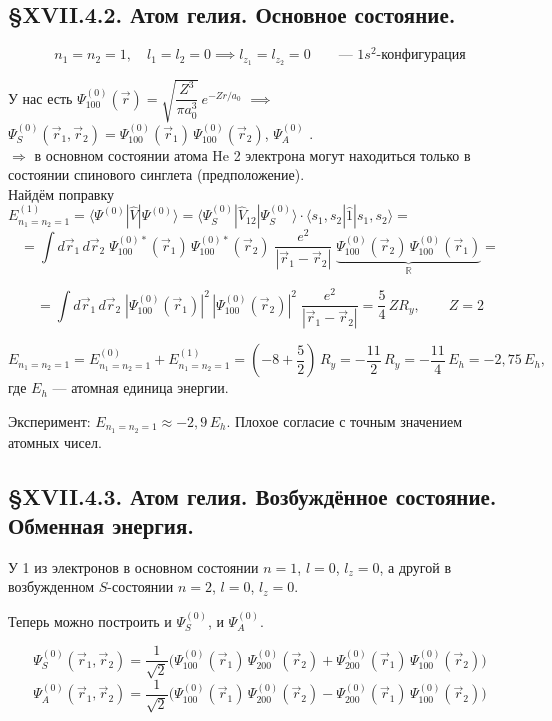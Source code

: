 \subsection{\S XVII.4.2. Атом гелия. Основное состояние.}

\[
n_1 = n_2 = 1, \quad l_1 = l_2 = 0 \implies l_{z_1} = l_{z_2} = 0 \qquad \text{--- $1s^2$-конфигурация}
\]

У нас есть $\Psi^{(0)}_{100}(\vec{r}) = \sqrt{\dfrac{Z^3}{\pi a_0^3}}\,e^{-Zr/a_0}$
$\implies$
$\Psi^{(0)}_S(\vec{r}_1, \vec{r}_2) = \Psi^{(0)}_{100}(\vec{r}_1)\,\Psi^{(0)}_{100}(\vec{r}_2)$, \quad $\Psi^{(0)}_A$ .\\

$\Rightarrow$ в основном состоянии атома He 2 электрона могут находиться только в состоянии спинового синглета (предположение).\\


Найдём поправку \quad $E^{(1)}_{n_1=n_2=1} = \langle\Psi^{(0)}|\hat{V}|\Psi^{(0)}\rangle = \langle\Psi^{(0)}_S|\hat{V}_{12}|\Psi^{(0)}_S\rangle\cdot\langle s_1, s_2|\hat{1}|s_1,s_2\rangle = $
\[
 = \int d\vec{r}_1\,d\vec{r}_2\;\Psi^{(0)*}_{100}(\vec{r}_1)\,\Psi^{(0)*}_{100}(\vec{r}_2)\;\dfrac{e^2}{|\vec{r}_1-\vec{r}_2|}\;\underbrace{\Psi^{(0)}_{100}(\vec{r}_2)\,\Psi^{(0)}_{100}(\vec{r}_1)}_{\mathbb{R}} =
\]

\[
= \int d\vec{r}_1\,d\vec{r}_2\;|\Psi^{(0)}_{100}(\vec{r}_1)|^2\,|\Psi^{(0)}_{100}(\vec{r}_2)|^2\;\frac{e^2}{|\vec{r}_1-\vec{r}_2|}
= \frac{5}{4}\,Z R_y, \qquad Z = 2
\]

\[
E_{n_1=n_2=1} = E^{(0)}_{n_1=n_2=1} + E^{(1)}_{n_1=n_2=1}
= (-8 + \frac{5}{2})\,R_y = -\frac{11}{2}\,R_y = -\frac{11}{4}\,E_h = -2{,}75\,E_h,
\]
где $E_h$ --- атомная единица энергии.

Эксперимент: $E_{n_1=n_2=1} \approx -2{,}9\,E_h$. Плохое согласие с точным значением атомных чисел.

\subsection{\S XVII.4.3. Атом гелия. Возбуждённое состояние. Обменная энергия.}

У 1 из электронов в основном состоянии \quad $n = 1$, $l = 0$, $l_z = 0$,
а другой в возбужденном $S$-состоянии \quad $n = 2$, $l = 0$, $l_z = 0$.

Теперь можно построить и $\Psi^{(0)}_S$, и $\Psi^{(0)}_A$.

\[
\Psi^{(0)}_S(\vec{r}_1, \vec{r}_2) = \frac{1}{\sqrt{2}}\Big(\Psi^{(0)}_{100}(\vec{r}_1)\,\Psi^{(0)}_{200}(\vec{r}_2) + \Psi^{(0)}_{200}(\vec{r}_1)\,\Psi^{(0)}_{100}(\vec{r}_2)\Big)
\]
\[
\Psi^{(0)}_A(\vec{r}_1, \vec{r}_2) = \frac{1}{\sqrt{2}}\Big(\Psi^{(0)}_{100}(\vec{r}_1)\,\Psi^{(0)}_{200}(\vec{r}_2) - \Psi^{(0)}_{200}(\vec{r}_1)\,\Psi^{(0)}_{100}(\vec{r}_2)\Big)
\]

